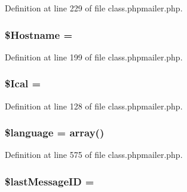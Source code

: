 Definition at line 229 of file class.\+phpmailer.\+php.

\subsubsection[{\texorpdfstring{\$\+Hostname}{$Hostname}}]{\setlength{\rightskip}{0pt plus 5cm}\$Hostname = \textquotesingle{}\textquotesingle{}}\hypertarget{class_p_h_p_mailer_a48a6eac112dcc8617b4001d985b656c8}{}\label{class_p_h_p_mailer_a48a6eac112dcc8617b4001d985b656c8}


Definition at line 199 of file class.\+phpmailer.\+php.

\subsubsection[{\texorpdfstring{\$\+Ical}{$Ical}}]{\setlength{\rightskip}{0pt plus 5cm}\$Ical = \textquotesingle{}\textquotesingle{}}\hypertarget{class_p_h_p_mailer_ace4b3f5855e39dec9993867ed920e30b}{}\label{class_p_h_p_mailer_ace4b3f5855e39dec9993867ed920e30b}


Definition at line 128 of file class.\+phpmailer.\+php.

\subsubsection[{\texorpdfstring{\$language}{$language}}]{\setlength{\rightskip}{0pt plus 5cm}\$language = array()\hspace{0.3cm}{\ttfamily [protected]}}\hypertarget{class_p_h_p_mailer_a83170d318260a5a2e2a79dccdd371b10}{}\label{class_p_h_p_mailer_a83170d318260a5a2e2a79dccdd371b10}


Definition at line 575 of file class.\+phpmailer.\+php.

\subsubsection[{\texorpdfstring{\$last\+Message\+ID}{$lastMessageID}}]{\setlength{\rightskip}{0pt plus 5cm}\$last\+Message\+ID = \textquotesingle{}\textquotesingle{}\hspace{0.3cm}{\ttfamily [protected]}}\hypertarget{class_p_h_p_mailer_a974888b4d036404356394cf76035174d}{}\label{class_p_h_p_mailer_a974888b4d036404356394cf76035174d}


